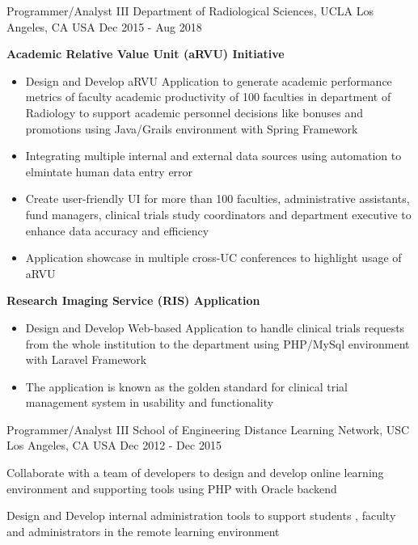 \begin{cventries}
  \cventry
    {Programmer/Analyst III} %
    {Department of Radiological Sciences, UCLA} %
    {Los Angeles, CA USA} %
    {Dec 2015 - Aug 2018} %
    {
       \begin{cvitems} %
        \item[] { {\bf Academic Relative Value Unit (aRVU) Initiative} 
            \begin{itemize} %
                \item {Design and Develop aRVU Application to generate academic performance metrics of faculty academic productivity of 100 faculties in department of Radiology to support academic personnel decisions like bonuses and promotions using Java/Grails environment with Spring Framework}
                \item {Integrating multiple internal and external data sources using automation to elmintate human data entry error}
                \item {Create user-friendly UI for more than 100 faculties, administrative assistants, fund managers, clinical trials study coordinators and department executive to enhance data accuracy and efficiency}
                \item {Application showcase in multiple cross-UC conferences to highlight usage of aRVU}
              \end{itemize}}
        \item[] {  {\bf Research Imaging Service (RIS) Application}  
            \begin{itemize} %
                \item {Design and Develop Web-based Application to handle clinical trials requests from the whole institution to the department using PHP/MySql environment with Laravel Framework}
                \item {The application is known as the golden standard for clinical trial management system in usability and functionality}
              \end{itemize}}
      \end{cvitems}
    }
	
  \cventry
    {Programmer/Analyst III} %
    {School of Engineering Distance Learning Network, USC} %
    {Los Angeles, CA USA} %
    {Dec 2012 - Dec 2015} %
    {
      \begin{cvitems} %
        \item {Collaborate with a team of developers to design and develop online learning environment and supporting tools using PHP with Oracle backend}
        \item {Design and Develop internal administration tools to support students , faculty and administrators  in the remote learning environment}       
      \end{cvitems}
    }


\end{cventries}
